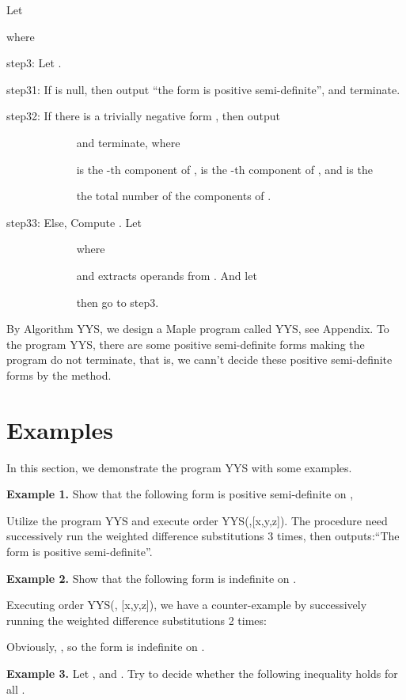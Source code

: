 \documentclass [10pt,a4paper]{article}
\begin{document}
\qquad Let


\qquad where

 step3: Let .

\quad step31:  If  is null, then output ``the form 
is positive semi-definite'', and terminate.

\quad step32:  If there is a trivially negative form
, then output


 ~~~~~~~~~~~~  and terminate, where

   \quad \quad \quad \quad\qquad


 ~~~~~~~~~~~~   is the -th component of ,  is the -th component
 of , and  is the

  ~~~~~~~~~~~~  the total number of the components of .

\quad step33:  Else, Compute
.  Let




~~~~~~~~~~~~  where


~~~~~~~~~~~~   and  extracts operands from
. And let


~~~~~~~~~~~~ then go to step3.

By Algorithm YYS, we design  a Maple program called YYS, see
Appendix. To the program YYS,  there are some positive semi-definite
forms making the program do not terminate, that is, we cann't decide
these positive semi-definite forms by the method.


\section{Examples}


In this section, we demonstrate the program  YYS with some examples.


 \textbf{Example 1.} Show that the following form is positive semi-definite on
 ,
 

Utilize the program YYS and execute order YYS(,[x,y,z]).  The
procedure need successively run the weighted dif\mbox{}ference
substitutions 3 times, then outputs:``The form  is positive
semi-definite''.


\textbf{Example 2.} Show that the following form is
indef\mbox{}inite on .
 

   Executing order YYS(, [x,y,z]), we have a
counter-example by successively running the weighted
dif\mbox{}ference substitutions 2 times:
 
Obviously, , so the  form  is indef\mbox{}inite on
.


\textbf{Example 3.} Let , and . Try to decide whether the following inequality holds for all
.
\end{document}

